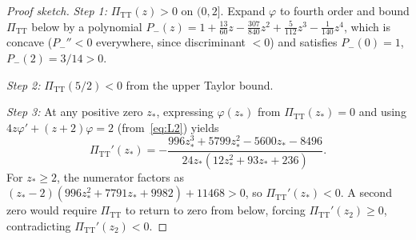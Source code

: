 \documentclass[12pt,a4paper]{article}
\newcommand{\PiTT}{\Pi_{\mathrm{TT}}}
\begin{document}
\begin{proof}[Proof sketch]
\emph{Step 1:} $\PiTT(z) > 0$ on $(0, 2]$.
Expand $\varphi$ to fourth order and bound $\PiTT$ below by a polynomial
$P_-(z) = 1 + \tfrac{13}{60}z - \tfrac{307}{840}z^2 + \tfrac{5}{112}z^3
- \tfrac{1}{140}z^4$, which is concave ($P_-'' < 0$ everywhere, since
discriminant $< 0$) and satisfies $P_-(0) = 1$, $P_-(2) = 3/14 > 0$.

\emph{Step 2:} $\PiTT(5/2) < 0$ from the upper Taylor bound.

\emph{Step 3:} At any positive zero $z_*$, expressing $\varphi(z_*)$ from
$\PiTT(z_*) = 0$ and using $4z\varphi' + (z+2)\varphi = 2$
(from~\eqref{eq:L2}) yields
\begin{equation}
  \PiTT'(z_*) = -\frac{996z_*^3 + 5799z_*^2 - 5600z_* - 8496}
  {24z_*(12z_*^2 + 93z_* + 236)}.
\end{equation}
For $z_* \geq 2$, the numerator factors as
$(z_*-2)(996z_*^2+7791z_*+9982) + 11468 > 0$,
so $\PiTT'(z_*) < 0$. A second zero would require $\PiTT$ to return
to zero from below, forcing $\PiTT'(z_2) \geq 0$, contradicting
$\PiTT'(z_2) < 0$.
\end{proof}
\end{document}
